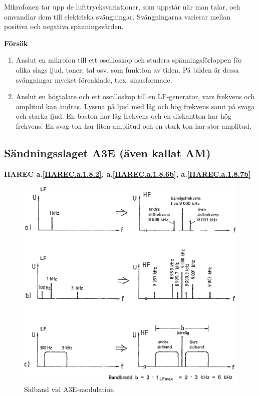 Mikrofonen tar upp de lufttrycksvariationer, som uppstår när man talar, och
omvandlar dem till elektriska svängningar.
Svängningarna varierar mellan positiva och negativa spänningsvärden.

\textbf{Försök}

\begin{enumerate}
\item Anslut en mikrofon till ett oscilloskop och studera spänningsförloppen
  för olika slags ljud, toner, tal osv. som funktion av tiden.
  På bilden är dessa svängningar mycket förenklade, t.ex. sinusformade.

\item Anslut en högtalare och ett oscilloskop till en LF-generator, vars
frekvens och amplitud kan ändras. Lyssna på ljud med låg och hög frekvens samt
på svaga och starka ljud.
En baston har låg frekvens och en diskantton har hög frekvens.
En svag ton har liten amplitud och en stark ton har stor amplitud.
\end{enumerate}

\subsection{Sändningsslaget A3E (även kallat AM)}
\textbf{HAREC a.\ref{HAREC.a.1.8.2}, a.\ref{HAREC.a.1.8.6b}, a.\ref{HAREC.a.1.8.7b}\label{myHAREC.a.1.8.2}\label{myHAREC.a.1.8.6b}\label{myHAREC.a.1.8.7b}}

\begin{figure}
\includegraphics[width=\textwidth]{images/cropped_pdfs/bild_2_1-24.pdf}
\caption{Sidband vid A3E-modulation}
\label{fig:BildII1-24}
\end{figure}

